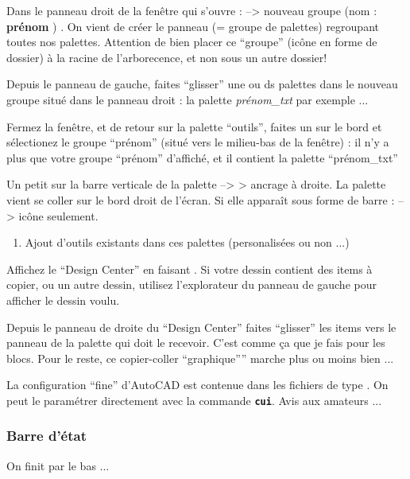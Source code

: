 \documentclass[a4paper,12pt,french]{sphinxmanual}
\begin{document}
Dans le panneau droit de la fenêtre qui s'ouvre :  --\textgreater{} nouveau groupe (nom : \textbf{prénom} ) . On vient de créer le panneau (= groupe de palettes) regroupant toutes nos palettes. Attention de bien placer ce ``groupe'' (icône en forme de dossier) à la racine de l'arborecence, et non sous un autre dossier!

Depuis le panneau de gauche, faites ``glisser'' une ou ds palettes dans le nouveau groupe situé dans le panneau droit : la palette \emph{prénom\_txt} par exemple ...

Fermez la fenêtre, et de retour sur la palette ``outils'', faites un  sur le bord et sélectionez le groupe ``prénom'' (situé vers le milieu-bas de la fenêtre) : il n'y a plus que votre groupe ``prénom'' d'affiché, et il contient la palette ``prénom\_txt''

Un petit  sur la barre verticale de la palette --\textgreater{} \textgreater{} ancrage à droite. La palette vient se coller sur le bord droit de l'écran. Si elle apparaît sous forme de barre :  --\textgreater{} icône seulement.
\begin{enumerate}
\item {} 
Ajout d'outils existants dans ces palettes (personalisées ou non ...)

\end{enumerate}

Affichez le ``Design Center'' en faisant . Si votre dessin contient des items à copier, ou un autre dessin, utilisez l'explorateur du panneau de gauche pour afficher le dessin voulu.

Depuis le panneau de droite du ``Design Center'' faites ``glisser'' les items vers le panneau de la palette qui doit le recevoir. C'est comme ça que je fais pour les blocs. Pour le reste, ce copier-coller ``graphique'''' marche plus ou moins bien ...




La configuration ``fine'' d'AutoCAD est contenue dans les fichiers de type  . On peut le paramétrer directement avec la commande \textbf{\texttt{cui}}. Avis aux amateurs ...




\subsubsection{Barre d'état}
\label{acad/config_acad:barre-d-etat}
On finit par le bas ...
\end{document}
